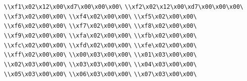 \verb|\\xf1\x02\x12\x00\xd7\x00\x00\x00\|\newline
\verb|\\xf2\x02\x12\x00\xd7\x00\x00\x00\|\newline
\verb|\\xf3\x02\x00\x00\|\newline
\verb|\\xf4\x02\x00\x00\|\newline
\verb|\\xf5\x02\x00\x00\|\newline
\verb|\\xf6\x02\x00\x00\|\newline
\verb|\\xf7\x02\x00\x00\|\newline
\verb|\\xf8\x02\x00\x00\|\newline
\verb|\\xf9\x02\x00\x00\|\newline
\verb|\\xfa\x02\x00\x00\|\newline
\verb|\\xfb\x02\x00\x00\|\newline
\verb|\\xfc\x02\x00\x00\|\newline
\verb|\\xfd\x02\x00\x00\|\newline
\verb|\\xfe\x02\x00\x00\|\newline
\verb|\\xff\x02\x00\x00\|\newline
\verb|\\x00\x03\x00\x00\|\newline
\verb|\\x01\x03\x00\x00\|\newline
\verb|\\x02\x03\x00\x00\|\newline
\verb|\\x03\x03\x00\x00\|\newline
\verb|\\x04\x03\x00\x00\|\newline
\verb|\\x05\x03\x00\x00\|\newline
\verb|\\x06\x03\x00\x00\|\newline
\verb|\\x07\x03\x00\x00\|\newline
